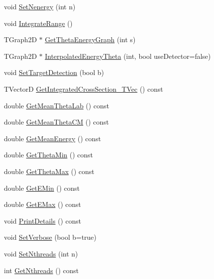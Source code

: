 \begin{DoxyCompactItemize}
void \hyperlink{classExperimentRange_a84cd068a026d0ab30ac0612aee68f74b}{Set\-Nenergy} (int n)
\item 
void \hyperlink{classExperimentRange_afbbbb4137620aa9ce50c2a42c7b7ed5d}{Integrate\-Range} ()
\item 
T\-Graph2\-D $\ast$ \hyperlink{classExperimentRange_a047d78a553fbfbaf8d7a840ecdbbb03e}{Get\-Theta\-Energy\-Graph} (int s)
\item 
T\-Graph2\-D $\ast$ \hyperlink{classExperimentRange_a7814ead31c329c275f928dbf97d7b68b}{Interpolated\-Energy\-Theta} (int, bool use\-Detector=false)
\item 
void \hyperlink{classExperimentRange_ac5170826c6f6d9bae33364bf06de6ba1}{Set\-Target\-Detection} (bool b)
\item 
T\-Vector\-D \hyperlink{classExperimentRange_aeaae632ca1999c91a60003501a302de6}{Get\-Integrated\-Cross\-Section\-\_\-\-T\-Vec} () const 
\item 
double \hyperlink{classExperimentRange_afa45529cc4c2f50064385a1c36c07ceb}{Get\-Mean\-Theta\-Lab} () const 
\item 
double \hyperlink{classExperimentRange_a2418fc250e4e8de383cdb6eb8aec4331}{Get\-Mean\-Theta\-C\-M} () const 
\item 
double \hyperlink{classExperimentRange_af2ac4cda863fc12f646a1e570d1328cd}{Get\-Mean\-Energy} () const 
\item 
double \hyperlink{classExperimentRange_a5ddd63cb813e69d51ae0a4cba3798011}{Get\-Theta\-Min} () const 
\item 
double \hyperlink{classExperimentRange_a93a9a3a0216f1abfb874b404e4c13601}{Get\-Theta\-Max} () const 
\item 
double \hyperlink{classExperimentRange_ac1da7f718e6f895639d1617f44a40ec0}{Get\-E\-Min} () const 
\item 
double \hyperlink{classExperimentRange_af06d3d2a7d54cd09ee413c1b7f54e74e}{Get\-E\-Max} () const 
\item 
void \hyperlink{classExperimentRange_a78aeaf6af38c928af3c390d0dbd23cd2}{Print\-Details} () const 
\item 
void \hyperlink{classExperimentRange_a95d3a225080af35191f59fe518bdb10f}{Set\-Verbose} (bool b=true)
\item 
void \hyperlink{classExperimentRange_a098eebb45b8e1290e7c23107612392a1}{Set\-Nthreads} (int n)
\item 
int \hyperlink{classExperimentRange_a5a29b5bc1c4d8095899643fdb14ba552}{Get\-Nthreads} () const 
\item 

\end{DoxyCompactItemize}
